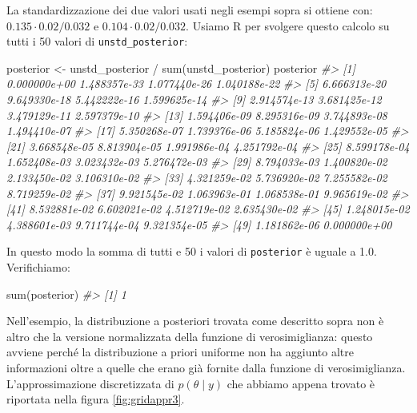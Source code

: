 \documentclass[
]{memoir}
\newenvironment{Shaded}{\begin{snugshade}}{\end{snugshade}}
\newcommand{\CommentTok}[1]{\textcolor[rgb]{0.56,0.35,0.01}{\textit{#1}}}
\newcommand{\FunctionTok}[1]{\textcolor[rgb]{0.00,0.00,0.00}{#1}}
\newcommand{\NormalTok}[1]{#1}
\newcommand{\OtherTok}[1]{\textcolor[rgb]{0.56,0.35,0.01}{#1}}
\newcommand{\SpecialCharTok}[1]{\textcolor[rgb]{0.00,0.00,0.00}{#1}}
\begin{document}
La standardizzazione dei due valori usati negli esempi sopra si ottiene con: \(0.135 \cdot 0.02 / 0.032\) e \(0.104 \cdot 0.02 / 0.032\). Usiamo R per svolgere questo calcolo su tutti i 50 valori di \texttt{unstd\_posterior}:

\begin{Shaded}
\begin{Highlighting}[]
\NormalTok{posterior }\OtherTok{\textless{}{-}}\NormalTok{ unstd\_posterior }\SpecialCharTok{/} \FunctionTok{sum}\NormalTok{(unstd\_posterior)}
\NormalTok{posterior}
\CommentTok{\#\textgreater{}  [1] 0.000000e+00 1.488357e{-}33 1.077440e{-}26 1.040188e{-}22}
\CommentTok{\#\textgreater{}  [5] 6.666313e{-}20 9.649330e{-}18 5.442222e{-}16 1.599625e{-}14}
\CommentTok{\#\textgreater{}  [9] 2.914574e{-}13 3.681425e{-}12 3.479129e{-}11 2.597379e{-}10}
\CommentTok{\#\textgreater{} [13] 1.594406e{-}09 8.295316e{-}09 3.744893e{-}08 1.494410e{-}07}
\CommentTok{\#\textgreater{} [17] 5.350268e{-}07 1.739376e{-}06 5.185824e{-}06 1.429552e{-}05}
\CommentTok{\#\textgreater{} [21] 3.668548e{-}05 8.813904e{-}05 1.991986e{-}04 4.251792e{-}04}
\CommentTok{\#\textgreater{} [25] 8.599178e{-}04 1.652408e{-}03 3.023432e{-}03 5.276472e{-}03}
\CommentTok{\#\textgreater{} [29] 8.794033e{-}03 1.400820e{-}02 2.133450e{-}02 3.106310e{-}02}
\CommentTok{\#\textgreater{} [33] 4.321259e{-}02 5.736920e{-}02 7.255582e{-}02 8.719259e{-}02}
\CommentTok{\#\textgreater{} [37] 9.921545e{-}02 1.063963e{-}01 1.068538e{-}01 9.965619e{-}02}
\CommentTok{\#\textgreater{} [41] 8.532881e{-}02 6.602021e{-}02 4.512719e{-}02 2.635430e{-}02}
\CommentTok{\#\textgreater{} [45] 1.248015e{-}02 4.388601e{-}03 9.711744e{-}04 9.321354e{-}05}
\CommentTok{\#\textgreater{} [49] 1.181862e{-}06 0.000000e+00}
\end{Highlighting}
\end{Shaded}

In questo modo la somma di tutti e 50 i valori di \texttt{posterior} è uguale a 1.0. Verifichiamo:

\begin{Shaded}
\begin{Highlighting}[]
\FunctionTok{sum}\NormalTok{(posterior)}
\CommentTok{\#\textgreater{} [1] 1}
\end{Highlighting}
\end{Shaded}

Nell'esempio, la distribuzione a posteriori trovata come descritto sopra non è altro che la versione normalizzata della funzione di verosimiglianza: questo avviene perché la distribuzione a priori uniforme non ha aggiunto altre informazioni oltre a quelle che erano già fornite dalla funzione di verosimiglianza. L'approssimazione discretizzata di \(p(\theta \mid y)\) che abbiamo appena trovato è riportata nella figura \ref{fig:gridappr3}.
\end{document}
